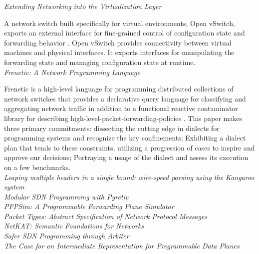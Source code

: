 \noindent \emph{Extending Networking into the Virtualization Layer}

A network switch built specifically for virtual environments, Open vSwitch,
exports an external interface
for fine-grained control of configuration state and forwarding behavior \cite{Pfaff2009}.
Open vSwitch provides
connectivity between virtual machines and physical interfaces. It exports
interfaces for manipulating
the forwarding state and managing configuration state at runtime. 
\\

\noindent \emph{Frenetic: A Network Programming Language} 

Frenetic is a high-level language for programming distributed collections of network
switches that provides a declarative query language for classifying and aggregating
network traffic in addition to a functional reactive contaminator library for describing
high-level-packet-forwarding-policies \cite{Foster:2011:FNP:2034773.2034812}.
This paper makes three primary commitments: dissecting the cutting edge in dialects for
programming systems and recognize the key confinements; Exhibiting a dialect plan that
tends to these constraints, utilizing a progression of cases to inspire and approve our
decisions; Portraying a usage of the dialect and assess its execution on a few benchmarks.
\\

\noindent \emph{Leaping multiple headers in a single bound: wire-speed parsing using the
	Kangaroo system}
\cite{Kozanitis:2010:LMH:1833515.1833654}\\


\noindent \emph{Modular SDN Programming with Pyretic}
\cite{Reich_modularsdn} \\

\noindent \emph{PFPSim: A Programmable Forwarding Plane Simulator} 
\cite{Abdi:2016:PPF:2881025.2881029}\\

\noindent \emph{Packet Types: Abstract Specification of Network Protocol Messages} 
\cite{McCann:2000:PTA:347059.347563} \\

\noindent \emph{NetKAT: Semantic Foundations for Networks} 
\cite{Anderson2014}\\

\noindent \emph{Safer SDN Programming through Arbiter} 
\cite{Lopez:2015:SSP:2936314.2814218}\\

\noindent \emph{The Case for an Intermediate Representation for Programmable Data Planes}
\cite{Shahbaz:2015:CIR:2774993.2775000} \\







